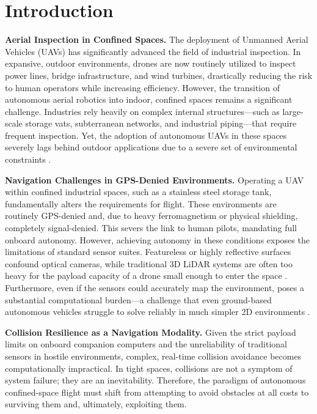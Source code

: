 \clearpage
\section{Introduction}

\textbf{Aerial Inspection in Confined Spaces.}
The deployment of Unmanned Aerial Vehicles (UAVs) has significantly advanced the field of industrial inspection. In expansive, outdoor environments, drones are now routinely utilized to inspect power lines, bridge infrastructure, and wind turbines, drastically reducing the risk to human operators while increasing efficiency. However, the transition of autonomous aerial robotics into indoor, confined spaces remains a significant challenge. Industries rely heavily on complex internal structures---such as large-scale storage vats, subterranean networks, and industrial piping---that require frequent inspection. Yet, the adoption of autonomous UAVs in these spaces severely lags behind outdoor applications due to a severe set of environmental constraints \cite{ozaslan2017inspection}.

\textbf{Navigation Challenges in GPS-Denied Environments.}
Operating a UAV within confined industrial spaces, such as a stainless steel storage tank, fundamentally alters the requirements for flight. These environments are routinely GPS-denied and, due to heavy ferromagnetism or physical shielding, completely signal-denied. This severs the link to human pilots, mandating full onboard autonomy. However, achieving autonomy in these conditions exposes the limitations of standard sensor suites. Featureless or highly reflective surfaces confound optical cameras, while traditional 3D LiDAR systems are often too heavy for the payload capacity of a drone small enough to enter the space \cite{khattak2020robust}. Furthermore, even if the sensors could accurately map the environment, poses a substantial computational burden---a challenge that even ground-based autonomous vehicles struggle to solve reliably in much simpler 2D environments \cite{macariorojas2021}.

\textbf{Collision Resilience as a Navigation Modality.}
Given the strict payload limits on onboard companion computers and the unreliability of traditional sensors in hostile environments, complex, real-time collision avoidance becomes computationally impractical. In tight spaces, collisions are not a symptom of system failure; they are an inevitability. Therefore, the paradigm of autonomous confined-space flight must shift from attempting to avoid obstacles at all costs to surviving them and, ultimately, exploiting them.

